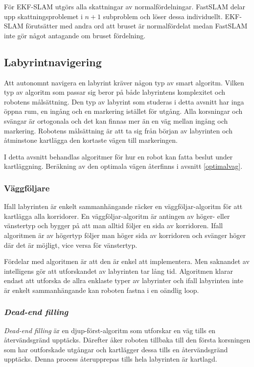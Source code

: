 \documentclass[11pt]{article}
\begin{document}
\begin{flushleft}
För EKF-SLAM utgörs alla skattningar av normalfördelningar. FastSLAM delar upp skattningsproblemet i $n + 1$ subproblem och löser dessa individuellt. EKF-SLAM förutsätter med andra ord att bruset är normalfördelat medan FastSLAM inte gör något antagande om bruset fördelning.

\subsection{Labyrintnavigering}
\label{mapping}
Att autonomnt navigera en labyrint kräver någon typ av smart algoritm. Vilken typ av algoritm som passar sig beror på både labyrintens komplexitet och robotens målsättning. Den typ av labyrint som studeras i detta avsnitt har inga öppna rum, en ingång och en markering istället för utgång. Alla korsningar och svängar är ortogonala och det kan finnas mer än en väg mellan ingång och markering. Robotens målsättning är att ta sig från början av labyrinten och åtminstone kartlägga den kortaste vägen till markeringen.

I detta avsnitt behandlas algoritmer för hur en robot kan fatta beslut under kartläggning. Beräkning av den optimala vägen återfinns i  avsnitt \ref{optimalvag}.

\subsubsection{Väggföljare}
Ifall labyrinten är enkelt sammanhängande räcker en väggföljar-algoritm för att kartlägga alla korridorer. En väggföljar-algoritm är antingen av höger- eller vänstertyp och bygger på att man alltid följer en sida av korridoren. Ifall algoritmen är av högertyp följer man höger sida av korridoren och svänger höger där det är möjligt, vice versa för vänstertyp.

Fördelar med algoritmen är att den är enkel att implementera. Men saknandet av intelligens gör att utforskandet av labyrinten tar lång tid. Algoritmen klarar endast att utforska de allra enklaste typer av labyrinter och ifall labyrinten inte är enkelt sammanhängande kan roboten fastna i en oändlig loop.

\subsubsection{\emph{Dead-end filling}}
\emph{Dead-end filling} är en djup-först-algoritm som utforskar en väg tills en återvändsgränd upptäcks. Därefter åker roboten tillbaka till den första korsningen som har outforskade utgångar och kartlägger dessa tills en återvändsgränd upptäcks. Denna process återupprepas tills hela labyrinten är kartlagd.


\end{flushleft}
\end{document}
